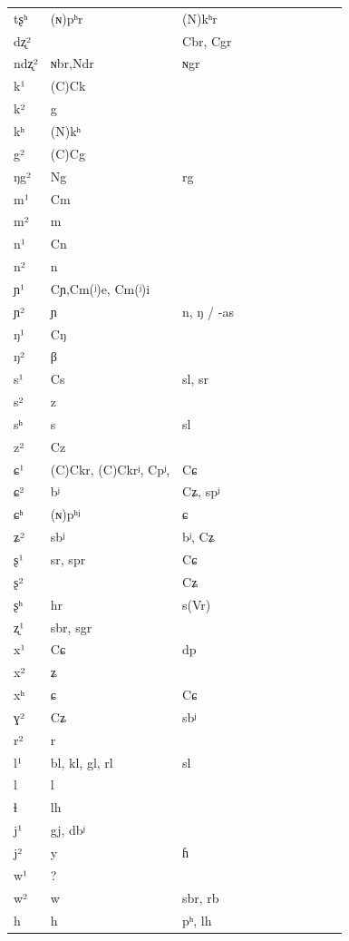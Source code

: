 \documentclass[oldfontcommands,oneside,a4paper,11pt]{memoir}
\begin{document}
\begin{longtable}{l|llllllllll}
tʂʰ  &  	(ɴ)pʰr  &  	(N)kʰr  \\  
dʐ²  &  	   &  	Cbr, Cgr  \\  
ndʐ²  &  	ɴbr,Ndr  &  	ɴgr  \\  
k¹  &  	(C)Ck  &  	   \\  
k²  &  	g  &  	   \\  
kʰ  &  	(N)kʰ  &  	   \\  
g²  &  	(C)Cg  &  	   \\  
ŋg²  &  	Ng  &  	rg  \\  
m¹  &  	Cm  &  	   \\  
m²  &  	m  &  	   \\  
n¹  &  	Cn  &  	   \\  
n²  &  	n  &  	   \\  
ɲ¹  &  	Cɲ,Cm(ʲ)e, Cm(ʲ)i  &  	   \\  
ɲ²  &  	ɲ  &  	n, ŋ / -as   \\  
ŋ¹  &  	Cŋ  &  	   \\  
ŋ²  &  	β  &  	   \\  
s¹  &  	Cs  &  	sl, sr  \\  
s²  &  	z  &  	   \\  
sʰ  &  	s  &  	sl  \\  
z²  &  	Cz  &  	   \\  
ɕ¹  &  	(C)Ckr, (C)Ckrʲ, Cpʲ,  &  	Cɕ  \\  
ɕ²  &  	bʲ  &  	Cʑ, spʲ  \\  
ɕʰ  &  	(ɴ)pʰʲ  &  	ɕ  \\  
ʑ²  &  	sbʲ  &  	bʲ, Cʑ  \\  
ʂ¹  &  	sr, spr  &  	Cɕ  \\  
ʂ²  &  	   &  	Cʑ  \\  
ʂʰ  &  	hr  &  	s(Vr)  \\  
ʐ¹  &  	sbr, sgr  &  	   \\  
x¹  &  	Cɕ  &  	dp  \\  
x²  &  	ʑ  &  	   \\  
xʰ  &  	ɕ  &  	Cɕ  \\  
ɣ²  &  	Cʑ  &  	sbʲ  \\  
r²  &  	r  &  	   \\  
l¹  &  	bl, kl, gl, rl  &  	sl  \\  
l  &  	l  &  	   \\  
ɬ  &  	lh  &  	   \\  
j¹  &  	gj, dbʲ  &  	   \\  
j²  &  	y  &  	ɦ  \\  
w¹  &  	?  &  	   \\  
w²  &  	w  &  	sbr, rb  \\  
h  &  	h  &  	pʰ, lh  \\  
\bottomrule
\end{longtable}
\end{document}
